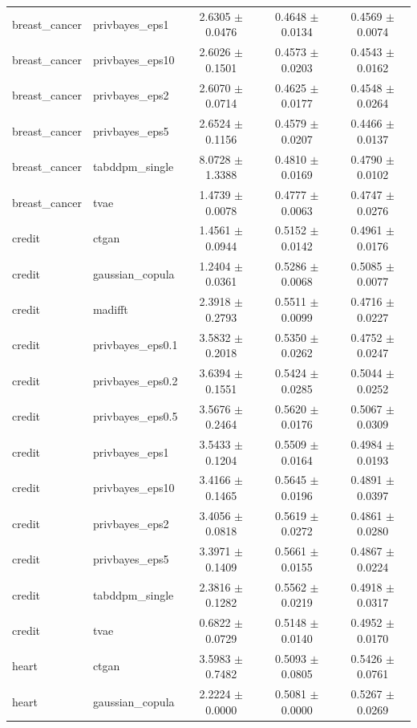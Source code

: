 \begin{tabular}{llccc}
breast_cancer & privbayes_eps1 & 2.6305 $\pm$ 0.0476 & 0.4648 $\pm$ 0.0134 & 0.4569 $\pm$ 0.0074 \\
breast_cancer & privbayes_eps10 & 2.6026 $\pm$ 0.1501 & 0.4573 $\pm$ 0.0203 & 0.4543 $\pm$ 0.0162 \\
breast_cancer & privbayes_eps2 & 2.6070 $\pm$ 0.0714 & 0.4625 $\pm$ 0.0177 & 0.4548 $\pm$ 0.0264 \\
breast_cancer & privbayes_eps5 & 2.6524 $\pm$ 0.1156 & 0.4579 $\pm$ 0.0207 & 0.4466 $\pm$ 0.0137 \\
breast_cancer & tabddpm_single & 8.0728 $\pm$ 1.3388 & 0.4810 $\pm$ 0.0169 & 0.4790 $\pm$ 0.0102 \\
breast_cancer & tvae & 1.4739 $\pm$ 0.0078 & 0.4777 $\pm$ 0.0063 & 0.4747 $\pm$ 0.0276 \\
credit & ctgan & 1.4561 $\pm$ 0.0944 & 0.5152 $\pm$ 0.0142 & 0.4961 $\pm$ 0.0176 \\
credit & gaussian_copula & 1.2404 $\pm$ 0.0361 & 0.5286 $\pm$ 0.0068 & 0.5085 $\pm$ 0.0077 \\
credit & madifft & 2.3918 $\pm$ 0.2793 & 0.5511 $\pm$ 0.0099 & 0.4716 $\pm$ 0.0227 \\
credit & privbayes_eps0.1 & 3.5832 $\pm$ 0.2018 & 0.5350 $\pm$ 0.0262 & 0.4752 $\pm$ 0.0247 \\
credit & privbayes_eps0.2 & 3.6394 $\pm$ 0.1551 & 0.5424 $\pm$ 0.0285 & 0.5044 $\pm$ 0.0252 \\
credit & privbayes_eps0.5 & 3.5676 $\pm$ 0.2464 & 0.5620 $\pm$ 0.0176 & 0.5067 $\pm$ 0.0309 \\
credit & privbayes_eps1 & 3.5433 $\pm$ 0.1204 & 0.5509 $\pm$ 0.0164 & 0.4984 $\pm$ 0.0193 \\
credit & privbayes_eps10 & 3.4166 $\pm$ 0.1465 & 0.5645 $\pm$ 0.0196 & 0.4891 $\pm$ 0.0397 \\
credit & privbayes_eps2 & 3.4056 $\pm$ 0.0818 & 0.5619 $\pm$ 0.0272 & 0.4861 $\pm$ 0.0280 \\
credit & privbayes_eps5 & 3.3971 $\pm$ 0.1409 & 0.5661 $\pm$ 0.0155 & 0.4867 $\pm$ 0.0224 \\
credit & tabddpm_single & 2.3816 $\pm$ 0.1282 & 0.5562 $\pm$ 0.0219 & 0.4918 $\pm$ 0.0317 \\
credit & tvae & 0.6822 $\pm$ 0.0729 & 0.5148 $\pm$ 0.0140 & 0.4952 $\pm$ 0.0170 \\
heart & ctgan & 3.5983 $\pm$ 0.7482 & 0.5093 $\pm$ 0.0805 & 0.5426 $\pm$ 0.0761 \\
heart & gaussian_copula & 2.2224 $\pm$ 0.0000 & 0.5081 $\pm$ 0.0000 & 0.5267 $\pm$ 0.0269 \\

\end{tabular}
